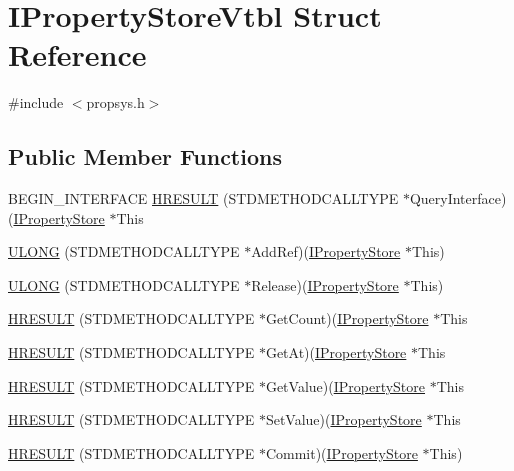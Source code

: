 \hypertarget{struct_i_property_store_vtbl}{}\section{I\+Property\+Store\+Vtbl Struct Reference}
\label{struct_i_property_store_vtbl}


{\ttfamily \#include $<$propsys.\+h$>$}

\subsection*{Public Member Functions}
\begin{DoxyCompactItemize}
\item 
B\+E\+G\+I\+N\+\_\+\+I\+N\+T\+E\+R\+F\+A\+CE \hyperlink{struct_i_property_store_vtbl_afa5766f1b56efc2509d728db69a64ef3}{H\+R\+E\+S\+U\+LT} (S\+T\+D\+M\+E\+T\+H\+O\+D\+C\+A\+L\+L\+T\+Y\+PE $\ast$Query\+Interface)(\hyperlink{propsys_8h_a65170341ea0bb1aca88c9925254a819f}{I\+Property\+Store} $\ast$This
\item 
\hyperlink{struct_i_property_store_vtbl_af175c00d0c03a00b3db3d9c3cdea724e}{U\+L\+O\+NG} (S\+T\+D\+M\+E\+T\+H\+O\+D\+C\+A\+L\+L\+T\+Y\+PE $\ast$Add\+Ref)(\hyperlink{propsys_8h_a65170341ea0bb1aca88c9925254a819f}{I\+Property\+Store} $\ast$This)
\item 
\hyperlink{struct_i_property_store_vtbl_a9510cad7b262f5a45b0ac659e921bf63}{U\+L\+O\+NG} (S\+T\+D\+M\+E\+T\+H\+O\+D\+C\+A\+L\+L\+T\+Y\+PE $\ast$Release)(\hyperlink{propsys_8h_a65170341ea0bb1aca88c9925254a819f}{I\+Property\+Store} $\ast$This)
\item 
\hyperlink{struct_i_property_store_vtbl_a93a6a408a7023c69fa9736fa2694f458}{H\+R\+E\+S\+U\+LT} (S\+T\+D\+M\+E\+T\+H\+O\+D\+C\+A\+L\+L\+T\+Y\+PE $\ast$Get\+Count)(\hyperlink{propsys_8h_a65170341ea0bb1aca88c9925254a819f}{I\+Property\+Store} $\ast$This
\item 
\hyperlink{struct_i_property_store_vtbl_a12eef9c1806d8d07c9cd1533d3700bed}{H\+R\+E\+S\+U\+LT} (S\+T\+D\+M\+E\+T\+H\+O\+D\+C\+A\+L\+L\+T\+Y\+PE $\ast$Get\+At)(\hyperlink{propsys_8h_a65170341ea0bb1aca88c9925254a819f}{I\+Property\+Store} $\ast$This
\item 
\hyperlink{struct_i_property_store_vtbl_ae6ffb9a616ddcb8d71684d7798e6539f}{H\+R\+E\+S\+U\+LT} (S\+T\+D\+M\+E\+T\+H\+O\+D\+C\+A\+L\+L\+T\+Y\+PE $\ast$Get\+Value)(\hyperlink{propsys_8h_a65170341ea0bb1aca88c9925254a819f}{I\+Property\+Store} $\ast$This
\item 
\hyperlink{struct_i_property_store_vtbl_aa73f899da082ad8b738ed556eb09849a}{H\+R\+E\+S\+U\+LT} (S\+T\+D\+M\+E\+T\+H\+O\+D\+C\+A\+L\+L\+T\+Y\+PE $\ast$Set\+Value)(\hyperlink{propsys_8h_a65170341ea0bb1aca88c9925254a819f}{I\+Property\+Store} $\ast$This
\item 
\hyperlink{struct_i_property_store_vtbl_aa024d4b64d989d9fa85fa0ee1adcdf29}{H\+R\+E\+S\+U\+LT} (S\+T\+D\+M\+E\+T\+H\+O\+D\+C\+A\+L\+L\+T\+Y\+PE $\ast$Commit)(\hyperlink{propsys_8h_a65170341ea0bb1aca88c9925254a819f}{I\+Property\+Store} $\ast$This)
\end{DoxyCompactItemize}
